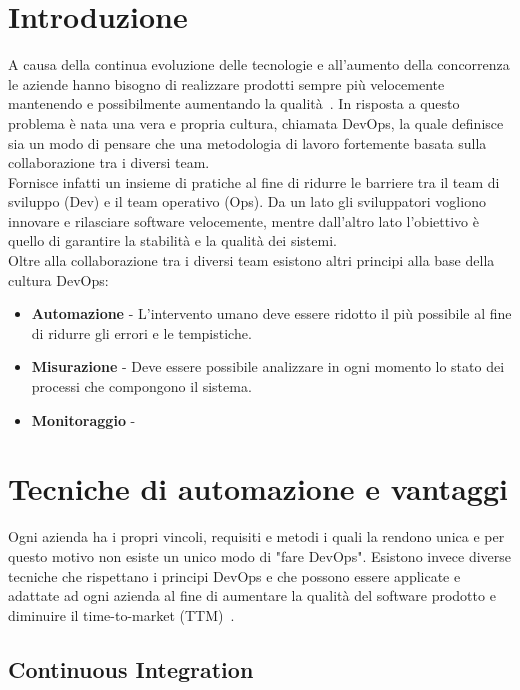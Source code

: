 
\section{Introduzione}
A causa della continua evoluzione delle tecnologie e all'aumento della concorrenza le aziende hanno bisogno di realizzare prodotti sempre più velocemente mantenendo e possibilmente aumentando la qualità~\cite{krief2019learning}. In risposta a questo problema è nata una vera e propria cultura, chiamata DevOps, la quale definisce sia un modo di pensare che una metodologia di lavoro fortemente basata sulla collaborazione tra i diversi team. \\
Fornisce infatti un insieme di pratiche al fine di ridurre le barriere tra il team di sviluppo (Dev) e il team operativo (Ops). Da un lato gli sviluppatori vogliono innovare e rilasciare software velocemente, mentre dall'altro lato l'obiettivo è quello di garantire la stabilità e la qualità dei sistemi.\\
Oltre alla collaborazione tra i diversi team esistono altri principi alla base della cultura DevOps:
\begin{itemize}
    \item \textbf{Automazione} - L'intervento umano deve essere ridotto il più possibile al fine di ridurre gli errori e le tempistiche.
    \item \textbf{Misurazione} - Deve essere possibile analizzare in ogni momento lo stato dei processi che compongono il sistema.
    \item \textbf{Monitoraggio} - 
\end{itemize}

\section{Tecniche di automazione e vantaggi}
Ogni azienda ha i propri vincoli, requisiti e metodi i quali la rendono unica e per questo motivo non esiste un unico modo di "fare DevOps". Esistono invece diverse tecniche che rispettano i principi DevOps e che possono essere applicate e adattate ad ogni azienda al fine di aumentare la qualità del software prodotto e diminuire il time-to-market (TTM)~\cite{devis2016effective}.

\subsection{Continuous Integration}

